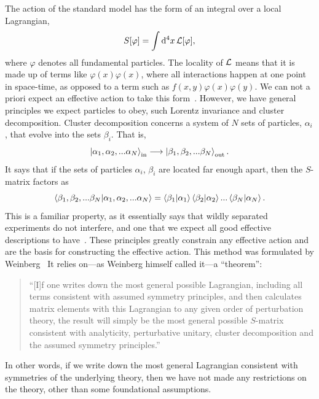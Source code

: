 The action of the standard model has the form of an integral over a local Lagrangian,
\begin{equation}
    S[\varphi] = \int \dd^4 x \, \mathcal{L}[\varphi],
\end{equation}
where $\varphi$ denotes all fundamental particles.
The locality of $\mathcal{L}$ means that it is made up of terms like $\varphi(x) \varphi(x)$, where all interactions happen at one point in space-time, as opposed to a term such as $f(x, y)\varphi(x) \varphi(y)$.
We can not a priori expect an effective action to take this form~\cite{Schwartz:QFT}.
However, we have general principles we expect particles to obey, such Lorentz invariance and cluster decomposition.
Cluster decomposition concerns a system of $N$ sets of particles, $\alpha_i$, that evolve into the sets $\beta_i$.
That is,
\begin{equation}
    \ket{\alpha_1, \alpha_2, ... \alpha_N}_\text{in}
    \longrightarrow
    \ket{\beta_1, \beta_2, ... \beta_N}_\text{out}.
\end{equation}
It says that if the sets of particles $\alpha_i$, $\beta_i$ are located far enough apart, then the $S$-matrix factors as
\begin{equation}
    {\braket{\beta_1, \beta_2, ... \beta_N}{\alpha_1, \alpha_2, ... \alpha_N}}
    =
    \braket{\beta_1}{\alpha_1}\braket{\beta_2}{\alpha_2}... \braket{\beta_N}{\alpha_N}.
\end{equation}
This is a familiar property, as it essentially says that wildly separated experiments do not interfere, and one that we expect all good effective descriptions to have~\cite{weinberg_1995,weinberg_1996_vol2}.
These principles greatly constrain any effective action and are the basis for constructing the \chpt effective action.
This method was formulated by Weinberg~\cite{WeinbergPhenom} 
It relies on---as Weinberg himself called it---a ``theorem'':
\begin{quote}
    ``[I]f one writes down the most general possible Lagrangian, including all terms consistent with assumed symmetry principles, and then calculates matrix elements with this Lagrangian to any given order of perturbation theory, the result will simply be the most general possible $S$-matrix consistent with analyticity, perturbative unitary, cluster decomposition and the assumed symmetry principles.'' \cite{WeinbergPhenom}
\end{quote}
In other words, if we write down the most general Lagrangian consistent with symmetries of the underlying theory, then we have not made any restrictions on the theory, other than some foundational assumptions.
